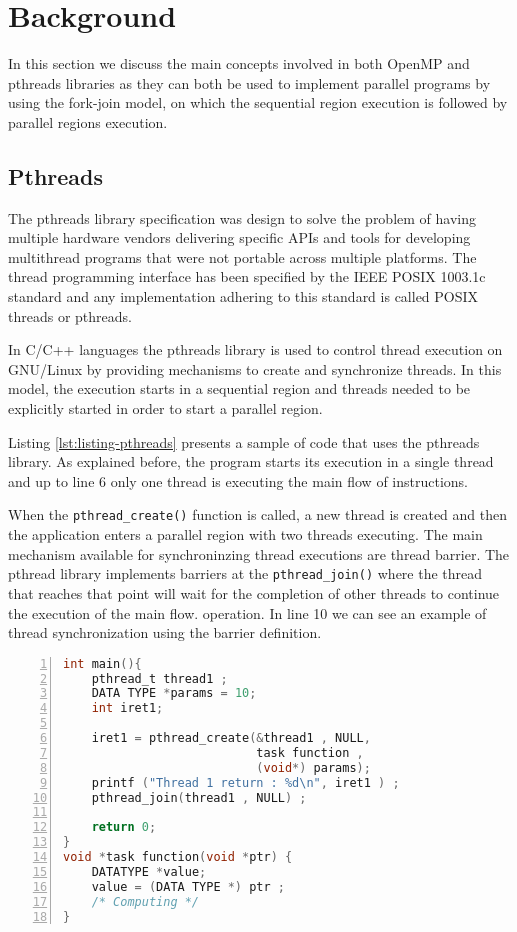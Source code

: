 \section{Background}
\label{sec:background}

In this section we discuss the main concepts involved in both OpenMP and
pthreads libraries as they can both be used to implement parallel programs by
using the fork-join model, on which the sequential region execution is followed
by parallel regions execution.


\subsection{Pthreads}

The pthreads library specification was design to solve the problem of having
multiple hardware vendors delivering specific APIs and tools for developing
multithread programs that were not portable across multiple platforms. The
thread programming interface has been specified by the IEEE POSIX 1003.1c
standard and any implementation adhering to this standard is called POSIX
threads or pthreads.

In C/C++ languages the pthreads library is used to control thread execution
on GNU/Linux by providing mechanisms to create and synchronize threads. In this
model, the execution starts in a sequential region and threads needed to be
explicitly started in order to start a parallel region.

Listing \ref{lst:listing-pthreads} presents a sample of code that uses the
pthreads library. As explained before, the program starts its execution in a
single thread and up to line 6 only one thread is executing the main flow of
instructions.

When the \texttt{pthread\_create()} function is called, a new thread is created
and then the application enters a parallel region with two threads executing.
The main mechanism available for synchroninzing thread executions are thread
barrier. The pthread library implements barriers at the
\texttt{pthread\_join()} where the thread that reaches that point will wait for
the completion of other threads to continue the execution of the main flow.
operation. In line 10 we can see an example of thread synchronization using the
barrier definition.

\begin{lstlisting}[language=C, basicstyle=\footnotesize, numbers=left, 
                   frame=single, showspaces=false, showstringspaces=false,
                   caption={Pthread Sample Program}, captionpos=b,
                   label=lst:listing-pthreads]
int main(){
    pthread_t thread1 ;
    DATA TYPE *params = 10;
    int iret1;
    
    iret1 = pthread_create(&thread1 , NULL, 
                           task function , 
                           (void*) params);
    printf ("Thread 1 return : %d\n", iret1 ) ;
    pthread_join(thread1 , NULL) ;

    return 0;
}
void *task function(void *ptr) { 
    DATATYPE *value;
    value = (DATA TYPE *) ptr ;
    /* Computing */
}
\end{lstlisting}

